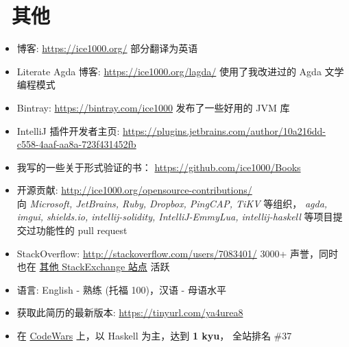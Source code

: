 \documentclass{resume}
\begin{document}
\section{\faInfo\ 其他}
\begin{itemize}[parsep=0.25ex]
  \item 博客: \url{https://ice1000.org/} 部分翻译为英语
  \item Literate Agda 博客: \url{https://ice1000.org/lagda/} 使用了我改进过的 Agda 文学编程模式
  \item Bintray: \url{https://bintray.com/ice1000} 发布了一些好用的 JVM 库
  \item IntelliJ 插件开发者主页: \url{https://plugins.jetbrains.com/author/10a216dd-c558-4aaf-aa8a-723f431452fb}
  \item 我写的一些关于形式验证的书： \url{https://github.com/ice1000/Books}
  \item 开源贡献: \url{http://ice1000.org/opensource-contributions/} \\
    向 \textit{Microsoft, JetBrains, Ruby, Dropbox, PingCAP, TiKV} 等组织，
    \textit{agda, imgui, shields.io, intellij-solidity, IntelliJ-EmmyLua,
      intellij-haskell} 等项目提交过功能性的 pull request
  \item StackOverflow: \url{http://stackoverflow.com/users/7083401/}
    3000+ 声誉，同时也在 \href{https://stackexchange.com/users/9532102/} {其他 StackExchange 站点} 活跃
  \item 语言: English - 熟练 (托福 100)，汉语 - 母语水平
  \item 获取此简历的最新版本: \url{https://tinyurl.com/ya4urea8}
  \item 在
    \href{https://www.codewars.com/users/ice1000} {CodeWars}
    上，以 Haskell 为主，达到
    \textbf{1 kyu}，
    全站排名 \#37
\end{itemize}

%
%
\end{document}
